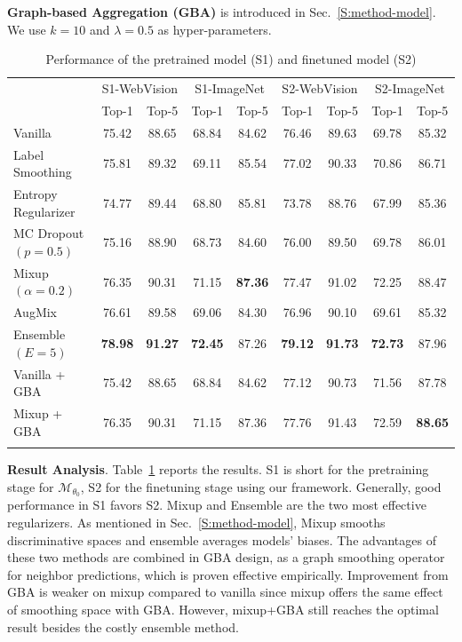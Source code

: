 \documentclass[runningheads]{llncs}
\begin{document}
\textbf{Graph-based Aggregation (GBA)} is introduced in Sec.~\ref{S:method-model}. We use $k=10$ and $\lambda=0.5$ as hyper-parameters.
	
\begin{table}[t]
	\caption{Performance of the pretrained model (S1) and finetuned model (S2)}
	\smallskip
	\centering
	\begin{tabular}{lcccccccc}
		\toprule
		{\multirow{2}{*}{Method}} & \multicolumn{2}{c}{S1-WebVision} & \multicolumn{2}{c}{S1-ImageNet} & \multicolumn{2}{c}{S2-WebVision} & \multicolumn{2}{c}{S2-ImageNet}\\
		\multicolumn{1}{c}{} & \multicolumn{1}{c}{Top-1} & \multicolumn{1}{c}{Top-5} & \multicolumn{1}{c}{Top-1} & \multicolumn{1}{c}{Top-5}  & \multicolumn{1}{c}{Top-1} & \multicolumn{1}{c}{Top-5} & \multicolumn{1}{c}{Top-1} & \multicolumn{1}{c}{Top-5}\\
		\midrule
		Vanilla 						& 75.42 & 88.65 & 68.84 & 84.62 & 76.46 & 89.63 & 69.78 & 85.32 \\ 
		Label Smoothing  		 & 75.81 & 89.32 & 69.11 & 85.54  & 77.02 & 90.33 & 70.86 & 86.71\\ 
		Entropy Regularizer 	& 74.77 & 89.44 & 68.80 & 85.81  & 73.78 & 88.76 & 67.99 & 85.36\\ 
		MC Dropout $(p=0.5)$ & 75.16 & 88.90 & 68.73 & 84.60 & 76.00 & 89.50 & 69.78 & 86.01 \\ 
		Mixup $(\alpha=0.2)$  & 76.35 & 90.31 & 71.15 & \textbf{87.36} & 77.47 & 91.02 & 72.25 & 88.47\\
		AugMix  						& 76.61 & 89.58 & 69.06 & 84.30 & 76.96 & 90.10 & 69.61 & 85.32\\
		Ensemble $(E=5)$ 	  & \textbf{78.98} & \textbf{91.27} & \textbf{72.45} & 87.26  & \textbf{79.12} & \textbf{91.73} & \textbf{72.73} & 87.96 \\ 
		\midrule
		Vanilla + GBA			   & 75.42 & 88.65 & 68.84 & 84.62 & 77.12 & 90.73 & 71.56 & 87.78\\
		Mixup + GBA			   & 76.35 & 90.31 & 71.15 & 87.36 & 77.76 & 91.43 & 72.59 & \textbf{88.65}\\
		\bottomrule
		\noalign{\bigskip}
	\end{tabular}
	\label{tab:stage1}
\end{table}

\textbf{Result Analysis}.
Table~\ref{tab:stage1} reports the results. S1 is short for the pretraining stage for $\mathcal{M}_{\theta_0}$, S2 for the finetuning stage using our framework. Generally, good performance in S1 favors S2. Mixup and Ensemble are the two most effective regularizers. As mentioned in Sec.~\ref{S:method-model}, Mixup smooths discriminative spaces and ensemble averages models’ biases. The advantages of these two methods are combined in GBA design, as a graph smoothing operator for neighbor predictions, which is proven effective empirically. Improvement from GBA is weaker on mixup compared to vanilla since mixup offers the same effect of smoothing space with GBA. However, mixup+GBA still reaches the optimal result besides the costly ensemble method.
\end{document}
